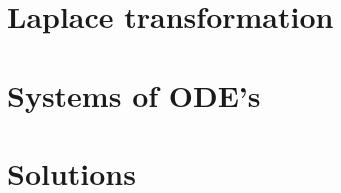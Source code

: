 \documentclass[a4paper]{book} %
\begin{document}
\chapter{Laplace transformation}

\chapter{Systems of ODE's}

\appendix
%
\chapter{Solutions}

%

\end{document}
